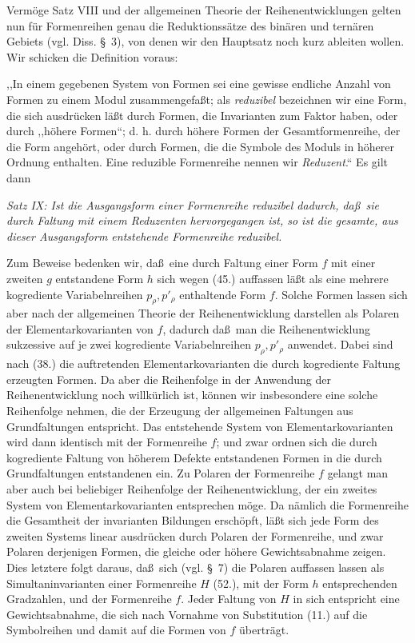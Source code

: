 Verm\"oge Satz VIII und der allgemeinen Theorie der Reihenentwicklungen gelten nun f\"ur Formenreihen genau die Reduktionss\"atze des bin\"aren und tern\"aren Gebiets (vgl. Diss. \S\ 3), von denen wir den Hauptsatz noch kurz ableiten wollen. Wir schicken die Definition voraus:

,,In einem gegebenen System von Formen sei eine gewisse endliche Anzahl von Formen zu einem Modul zusammengefa\ss t; als \emph{reduzibel} bezeichnen wir eine Form, die sich ausdr\"ucken l\"a\ss t durch Formen, die Invarianten zum Faktor haben, oder durch ,,h\"ohere Formen``; d. h. durch h\"ohere Formen der Gesamtformenreihe, der die Form angeh\"ort, oder durch Formen, die die Symbole des Moduls in h\"oherer Ordnung enthalten. Eine reduzible Formenreihe nennen wir \emph{Reduzent}.`` Es gilt dann

\emph{Satz IX: Ist die Ausgangsform einer Formenreihe reduzibel dadurch, da\ss\ sie durch Faltung mit einem Reduzenten hervorgegangen ist, so ist die gesamte, aus dieser Ausgangsform entstehende Formenreihe reduzibel.}

Zum Beweise bedenken wir, da\ss\ eine durch Faltung einer Form $f$ mit einer zweiten $g$ entstandene Form $h$ sich wegen (45.) auffassen l\"a\ss t als eine mehrere kogrediente Variabelnreihen $p_\rho,p'_\rho$ enthaltende Form $f$. Solche Formen lassen sich aber nach der allgemeinen Theorie der Reihenentwicklung darstellen als Polaren der Elementarkovarianten von $f$, dadurch da\ss\ man die Reihenentwicklung sukzessive auf je zwei kogrediente Variabelnreihen $p_\rho,p'_\rho$ anwendet. Dabei sind nach (38.) die auftretenden Elementarkovarianten die durch kogrediente Faltung erzeugten Formen. Da aber die Reihenfolge in der Anwendung der Reihenentwicklung noch willk\"urlich ist, k\"onnen wir insbesondere eine solche Reihenfolge nehmen, die der Erzeugung der allgemeinen Faltungen aus Grundfaltungen entspricht. Das entstehende System von Elementarkovarianten wird dann identisch mit der Formenreihe $f$; und zwar ordnen sich die durch kogrediente Faltung von h\"oherem Defekte entstandenen Formen in die durch Grundfaltungen entstandenen ein. Zu Polaren der Formenreihe $f$ gelangt man aber auch bei beliebiger Reihenfolge der Reihenentwicklung, der ein zweites System von Elementarkovarianten entsprechen m\"oge. Da n\"amlich die Formenreihe die Gesamtheit der invarianten Bildungen ersch\"opft, l\"a\ss t sich jede Form des zweiten Systems linear ausdr\"ucken durch Polaren der Formenreihe, und zwar Polaren derjenigen Formen, die gleiche oder h\"ohere Gewichtsabnahme zeigen. Dies letztere folgt daraus, da\ss\ sich (vgl. \S\ 7) die Polaren auffassen lassen als Simultaninvarianten einer Formenreihe $H$ (52.), mit der Form $h$ entsprechenden Gradzahlen, und der Formenreihe $f$. Jeder Faltung von $H$ in sich entspricht eine Gewichtsabnahme, die sich nach Vornahme von Substitution (11.) auf die Symbolreihen und damit auf die Formen von $f$ \"ubertr\"agt.

